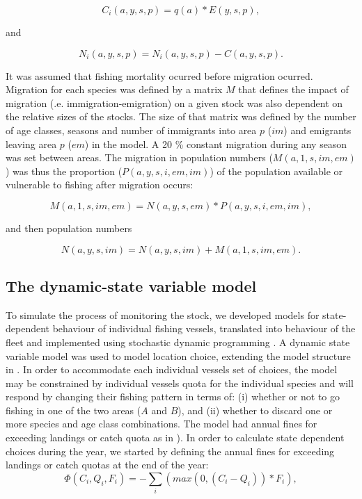 \documentclass[12pt,oneline,a4paper,numbib]{ouparticle}
\numberwithin{equation}{subsection} %
\begin{document}
\begin{equation}
C_i (a, y, s, p) = q(a) * E(y,s,p),
\end{equation}

and 

\begin{equation}
N_i (a, y, s, p) = N_i (a, y, s, p) - C (a, y, s, p). 
\end{equation}

It was assumed that fishing mortality ocurred before migration ocurred. Migration for each species was defined by a matrix $M$ that defines the impact of migration (.e. immigration-emigration) on a given stock was also dependent on the relative sizes of the stocks. The size of that matrix  was defined by the number of age classes, seasons and number of immigrants into area $p$ ($im$) and emigrants leaving area $p$ ($em$) in the model. A 20 \% constant migration during any season was set between areas. The migration in population numbers ($M (a, 1, s, im, em)$) was thus the proportion ($P (a, y, s, i, em, im)$) of the population available or vulnerable to fishing after migration occurs:   

\begin{equation}
M (a, 1, s, im, em) = N (a, y, s, em) * P (a, y, s, i, em, im),
\end{equation}

and then population numbers

\begin{equation}
N (a, y, s, im) = N (a, y, s, im) +  M (a, 1, s, im, em).
\end{equation}


\subsection{The dynamic-state variable model}
\label{sec2.2}

To simulate the process of monitoring the stock, we developed models for state-dependent behaviour of individual fishing vessels, translated into behaviour of the fleet and implemented using stochastic dynamic programming \cite{Alzorriz2018, Batsleer2015, ClarkandMangel2000, Dowling2011, Houston1999, Poos2010}. A dynamic state variable model \cite{ClarkandMangel2000, Houston1999} was used to model location choice, extending the model structure in \cite{Batsleer2015}. In order to accommodate each individual vessels set of choices, the model may be constrained by individual vessels quota for the individual species and will respond by changing their fishing pattern in terms of: (i) whether or not to go fishing in one of the two areas ($A$ and $B$), and (ii) whether to discard one or more species and age class combinations. The model had annual fines for exceeding landings or catch quota as in \cite{Alzorriz2018}). In order to calculate state dependent choices during the year, we started by defining the annual fines for exceeding landings or catch quotas at the end of the year:
\begin{equation}
\Phi (C_i, Q_i, F_i)= -\sum_i (max( 0, (C_i - Q_i))* F_i),
\end{equation}
\end{document}
